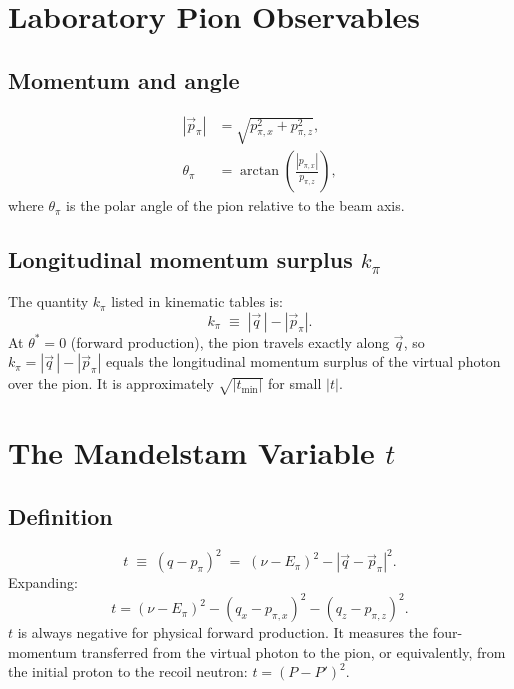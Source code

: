 \documentclass[12pt,a4paper]{article}
\begin{document}
\section{Laboratory Pion Observables}

\subsection{Momentum and angle}

\begin{align}
  |\vec{p}_\pi| &= \sqrt{p_{\pi,x}^2 + p_{\pi,z}^2},
  \label{eq:pmag}\\[4pt]
  \theta_\pi &= \arctan\!\left(\frac{|p_{\pi,x}|}{p_{\pi,z}}\right),
  \label{eq:thetapi}
\end{align}
where $\theta_\pi$ is the polar angle of the pion relative to the beam axis.

\subsection{Longitudinal momentum surplus \texorpdfstring{$k_\pi$}{kpi}}

The quantity $k_\pi$ listed in kinematic tables is:
\begin{equation}
  k_\pi \;\equiv\; |\vec{q}\,| - |\vec{p}_\pi|.
  \label{eq:kpi}
\end{equation}
At $\theta^* = 0$ (forward production), the pion travels exactly along
$\vec{q}$, so $k_\pi = |\vec{q}\,| - |\vec{p}_\pi|$ equals the longitudinal
momentum surplus of the virtual photon over the pion. It is approximately
$\sqrt{|t_\text{min}|}$ for small $|t|$.

\section{The Mandelstam Variable \texorpdfstring{$t$}{t}}

\subsection{Definition}

\begin{equation}
  t \;\equiv\; (q - p_\pi)^2
    \;=\; (\nu - E_\pi)^2 - |\vec{q} - \vec{p}_\pi|^2.
  \label{eq:t}
\end{equation}
Expanding:
\begin{equation}
  t = (\nu - E_\pi)^2 - (q_x - p_{\pi,x})^2 - (q_z - p_{\pi,z})^2.
  \label{eq:t_expanded}
\end{equation}
$t$ is always negative for physical forward production. It measures the
four-momentum transferred from the virtual photon to the pion, or
equivalently, from the initial proton to the recoil neutron:
$t = (P - P')^2$.
\end{document}
